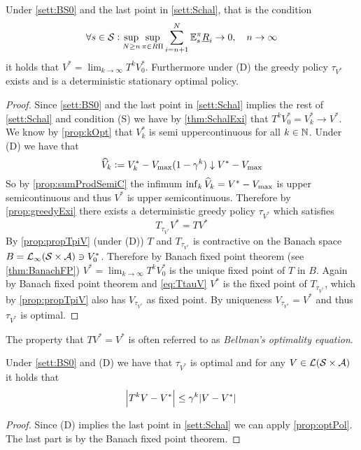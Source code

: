 \begin{prop}
  Under \cref{sett:BS0} and the last point in \cref{sett:Schal},
  that is the condition
  \[ \forall s \in \mathcal{S} : \sup_{N \geq n} \sup_{\pi \in R\Pi} \sum_{i=n+1}^N
  \mathbb{E}_s^\pi \underline{R}_i \to 0, \quad n \to \infty \]
  it holds that $V^* = \lim_{k\to\infty} T^k V^*_0$.
  Furthermore under (D) the greedy policy
  $\tau_{V^*}$ exists and is a deterministic
  stationary optimal policy.
  \label{prop:optPol}
\end{prop}
\begin{proof}
  Since \cref{sett:BS0} and the last point in \cref{sett:Schal} implies
  the rest of \cref{sett:Schal} and condition (S) we have by
  \cref{thm:SchalExi} that $T^k V^*_0 = V^*_k \to V^*$.
  We know by \cref{prop:kOpt} that $V^*_k$ is semi uppercontinuous for all
  $k \in \mathbb{N}$.
  Under (D) we have that
  \[ \widehat{V}_k \vcentcolon= V^*_k - V_{\max} (1 - \gamma^k)
  \downarrow V^* - V_{\max} \]
  So by \cref{prop:sumProdSemiC} the infimum
  $\inf_k \widehat{V}_k = V^* - V_{\max}$ is upper semicontinuous and thus
  $V^*$ is upper semicontinuous.
  Therefore by \cref{prop:greedyExi} there exists a deterministic
  greedy policy $\tau_{V^*}$ which satisfies
  \begin{equation} T_{\tau_{V^*}} V^* = T V^* \label{eq:TtauV} \end{equation}
  By \cref{prop:propTpiV} (under (D)) $T$ and $T_{\tau_{V^*}}$
  is contractive on the Banach space
  $B = \mathcal{L}_\infty(\mathcal{S} \times \mathcal{A}) \ni V^*_0$.
  Therefore by Banach fixed point theorem (see \cref{thm:BanachFP})
  $V^* = \lim_{k\to\infty} T^k V^*_0$ is the unique fixed point
  of $T$ in $B$.
  Again by Banach fixed point theorem and \cref{eq:TtauV} $V^*$ is the fixed
  point of $T_{\tau_{V^*}}$, which by \cref{prop:propTpiV} also has
  $V_{\tau_{V^*}}$ as fixed point. By uniqueness
  $V_{\tau_{V^*}} = V^*$ and thus $\tau_{V^*}$ is optimal.
\end{proof}

\begin{rem}
  The property that $TV^* = V^*$ is often referred to as
  \emph{Bellman's optimality equation}.
\end{rem}

\begin{cor}
  Under \cref{sett:BS0} and (D) we have that $\tau_{V^*}$ is optimal
  and for any $V \in \mathcal{L}(\mathcal{S} \times \mathcal{A})$ it holds that
  \[ \abs{T^k V - V^*} \leq \gamma^k \abs{V - V^*} \]
  \label{cor:Viteration}
\end{cor}
\begin{proof}
  Since (D) implies the last point in \cref{sett:Schal} we can apply
  \cref{prop:optPol}. The last part is by the Banach fixed point theorem.
\end{proof}


